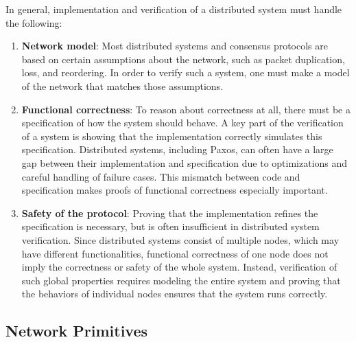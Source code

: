 In general, implementation and verification of a distributed system must handle the following:
\begin{enumerate}
\item \textbf{Network model}:
Most distributed systems and consensus protocols are based on certain assumptions about the network,
such as packet duplication, loss, and reordering. In order to verify such a system, one must make a model of the network that matches
those assumptions.

\item \textbf{Functional correctness}: 
To reason about correctness at all, there must be a specification of how the system should behave.
A key part of the verification of a system is showing that the implementation correctly simulates this specification.
Distributed systems, including Paxos, can often have a large gap between their implementation and specification due to optimizations and careful handling of failure cases.
This mismatch between code and specification makes proofs of functional correctness especially important.

\item \textbf{Safety of the protocol}: 
Proving that the implementation refines the specification is necessary, but is often insufficient in distributed system verification.
Since distributed systems consist of multiple nodes, which may have different functionalities,
functional correctness of one node does not imply the correctness or safety of the whole system.
Instead, verification of such global properties requires modeling the entire system and
proving that the behaviors of individual nodes ensures that the system runs correctly.
\end{enumerate}



\newcommand{\envcontext}{\varepsilon}
\newcommand{\layerdef}{\mathcal{L}}
\newcommand{\relyrule}{\mathcal{R}}
\newcommand{\guaranteerule}{\mathcal{G}}
\newcommand{\primid}{id}
\newcommand{\primspec}[1]{\sigma_{#1}}
\newcommand{\igchar}{\_}
\newcommand{\sendpkt}[3]{{#1}.\mathrm{SEND}{[#2]}.{#3}}
\newcommand{\recvpkt}[3]{{#1}.\mathrm{RECV}{[#2]}.{#3}}

\subsection{Network Primitives}
\label{subsec:network-primitives}

